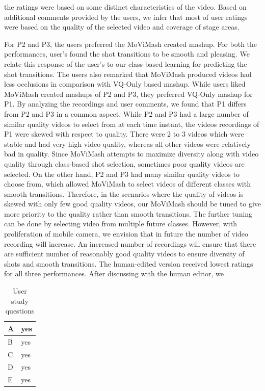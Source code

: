 \documentclass{sig-alternate-05-2015}
\begin{document}
the ratings were
based on some distinct characteristics of the video. Based on additional comments provided by the users, we infer that most of user
ratings were based on the quality of the selected video and coverage
of stage areas.\par
For P2 and P3, the users preferred the MoViMash created mashup.
For both the performances, user’s found the shot transitions to be
smooth and pleasing. We relate this response of the user’s to our
class-based learning for predicting the shot transitions. The users
also remarked that MoViMash produced videos had less occlusions
in comparison with VQ-Only based mashup. While users liked MoViMash created mashups of P2 and P3,
they preferred VQ-Only mashup for P1. By analyzing the recordings and user comments, we found that P1 differs from P2 and P3 in
a common aspect. While P2 and P3 had a large number of similar
quality videos to select from at each time instant, the videos recordings of P1 were skewed with respect to quality. There were 2 to 3
videos which were stable and had very high video quality, whereas
all other videos were relatively bad in quality. Since MoViMash
attempts to maximize diversity along with video quality through
class-based shot selection, sometimes poor quality videos are selected.
On the other hand, P2 and P3 had many similar quality videos
to choose from, which allowed MoViMash to select videos of different classes with smooth transitions. Therefore, in the scenarios
where the quality of videos is skewed with only few good quality
videos, our MoViMash should be tuned to give more priority to
the quality rather than smooth transitions. The further tuning can
be done by selecting video from multiple future classes. However,
with proliferation of mobile camera, we envision that in future the
number of video recording will increase. An increased number of
recordings will ensure that there are sufficient number of reasonably good quality videos to ensure diversity of shots and smooth
transitions.
The human-edited version received lowest ratings for all three
performances. After discussing with the human editor, we 
\begin{table}
\centering
\caption{ User study questions }
\begin{tabular}{p{1.2cm}|p{3.6cm}} \hline
A&yes\\ \hline
B&yes\\ \hline
C&yes\\ \hline
D&yes\\ \hline
E&yes\\ \hline
\end{tabular}
\end{table}
\end{document}
